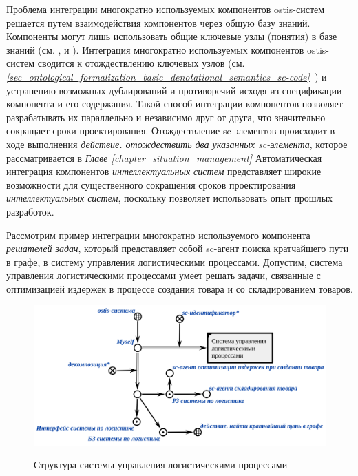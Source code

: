 Проблема интеграции многократно используемых компонентов ostis-систем решается путем взаимодействия компонентов через общую базу знаний. Компоненты могут лишь использовать общие ключевые узлы (понятия) в базе знаний (см. ,  и ). Интеграция многократно используемых компонентов ostis-систем сводится к отождествлению ключевых узлов (см. \textit{\ref{sec_ontological_formalization_basic_denotational_semantics_sc-code}~}) и устранению возможных дублирований и противоречий исходя из спецификации компонента и его содержания. Такой способ интеграции компонентов позволяет разрабатывать их параллельно и независимо друг от друга, что значительно сокращает сроки проектирования. Отождествление sc-элементов происходит в ходе выполнения \textit{действие. отождествить два указанных sc-элемента}, которое рассматривается в \textit{Главе \ref{chapter_situation_management}} Автоматическая интеграция компонентов \textit{интеллектуальных систем} представляет широкие возможности для существенного сокращения сроков проектирования \textit{интеллектуальных систем}, поскольку позволяет использовать опыт прошлых разработок.

Рассмотрим пример интеграции многократно используемого компонента \textit{решателей задач}, который представляет собой sc-агент поиска кратчайшего пути в графе, в систему управления логистическими процессами. Допустим, система управления логистическими процессами умеет решать задачи, связанные с оптимизацией издержек в процессе создания товара и со складированием товаров. 

\begin{figure}[H]
	\caption{Структура системы управления логистическими процессами}
	\includegraphics[scale=0.5]{author/part5/figures/logistics_system.png}
	\label{fig:logistics_system}
\end{figure}

